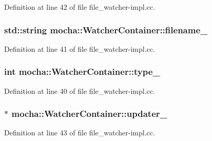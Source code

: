 Definition at line 42 of file file\_\-watcher-\/impl.cc.

\hypertarget{classmocha_1_1_watcher_container_af155dc17f26a3fe5778ef93e8b26717d}{
\subsubsection[{filename\_\-}]{\setlength{\rightskip}{0pt plus 5cm}std::string {\bf mocha::WatcherContainer::filename\_\-}}}
\label{classmocha_1_1_watcher_container_af155dc17f26a3fe5778ef93e8b26717d}


Definition at line 41 of file file\_\-watcher-\/impl.cc.

\hypertarget{classmocha_1_1_watcher_container_aa6c90f7132c8d0f6f80a14cd3fc99e8b}{
\subsubsection[{type\_\-}]{\setlength{\rightskip}{0pt plus 5cm}int {\bf mocha::WatcherContainer::type\_\-}}}
\label{classmocha_1_1_watcher_container_aa6c90f7132c8d0f6f80a14cd3fc99e8b}


Definition at line 40 of file file\_\-watcher-\/impl.cc.

\hypertarget{classmocha_1_1_watcher_container_a0700b1fe0114d68f17cf615ca2fbe99d}{
\subsubsection[{updater\_\-}]{ $\ast$ {\bf mocha::WatcherContainer::updater\_\-}}}
\label{classmocha_1_1_watcher_container_a0700b1fe0114d68f17cf615ca2fbe99d}


Definition at line 43 of file file\_\-watcher-\/impl.cc.

